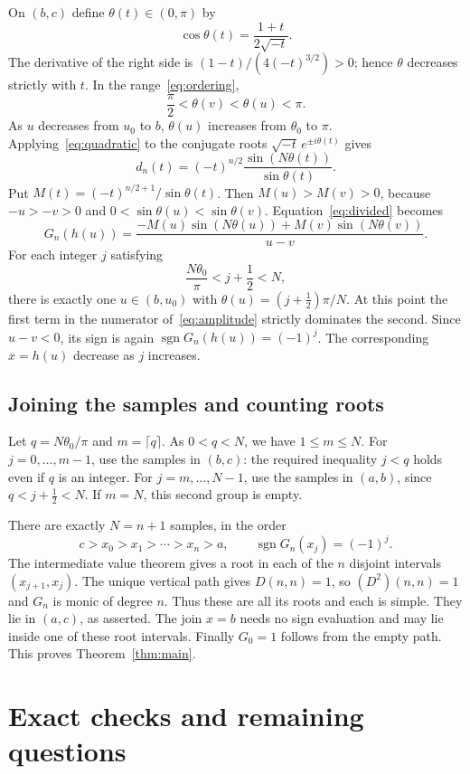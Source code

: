 \documentclass[11pt]{article}
\DeclareMathOperator{\sgn}{sgn}
\begin{document}
On $(b,c)$ define $\theta(t)\in(0,\pi)$ by
\[
 \cos\theta(t)=\frac{1+t}{2\sqrt{-t}}.
\]
The derivative of the right side is $(1-t)/(4(-t)^{3/2})>0$;
hence $\theta$ decreases strictly with $t$. In the range~\eqref{eq:ordering},
\[
 \frac\pi2<\theta(v)<\theta(u)<\pi.
\]
As $u$ decreases from $u_0$ to $b$, $\theta(u)$ increases from
$\theta_0$ to $\pi$. Applying~\eqref{eq:quadratic} to the conjugate
roots $\sqrt{-t}\,e^{\pm i\theta(t)}$ gives
\[
 d_n(t)=(-t)^{n/2}\frac{\sin(N\theta(t))}{\sin\theta(t)}.
\]
Put $M(t)=(-t)^{n/2+1}/\sin\theta(t)$. Then $M(u)>M(v)>0$,
because $-u>-v>0$ and
$0<\sin\theta(u)<\sin\theta(v)$. Equation~\eqref{eq:divided} becomes
\begin{equation}\label{eq:amplitude}
 G_n(h(u))=
 \frac{-M(u)\sin(N\theta(u))+M(v)\sin(N\theta(v))}{u-v}.
\end{equation}
For each integer $j$ satisfying
\begin{equation}\label{eq:leftindices}
 \frac{N\theta_0}{\pi}<j+\frac12<N,
\end{equation}
there is exactly one $u\in(b,u_0)$ with
$\theta(u)=(j+\tfrac12)\pi/N$. At this point the first term in the
numerator of~\eqref{eq:amplitude} strictly dominates the second.
Since $u-v<0$, its sign is again $\sgn G_n(h(u))=(-1)^j$.
The corresponding $x=h(u)$ decrease as $j$ increases.

\subsection{Joining the samples and counting roots}

Let $q=N\theta_0/\pi$ and $m=\lceil q\rceil$. As $0<q<N$,
we have $1\leq m\leq N$. For $j=0,\ldots,m-1$, use the samples
in $(b,c)$: the required inequality $j<q$ holds even if $q$ is an
integer. For $j=m,\ldots,N-1$, use the samples in $(a,b)$, since
$q<j+\tfrac12<N$. If $m=N$, this second group is empty.

There are exactly $N=n+1$ samples, in the order
\[
 c>x_0>x_1>\cdots>x_n>a,\qquad \sgn G_n(x_j)=(-1)^j.
\]
The intermediate value theorem gives a root in each of the $n$ disjoint
intervals $(x_{j+1},x_j)$. The unique vertical path gives $D(n,n)=1$,
so $(D^2)(n,n)=1$ and $G_n$ is monic of degree $n$. Thus these are
all its roots and each is simple. They lie in $(a,c)$, as asserted.
The join $x=b$ needs no sign evaluation and may lie inside one of these
root intervals. Finally $G_0=1$ follows from the empty path. This proves
Theorem~\ref{thm:main}.

\section{Exact checks and remaining questions}
\end{document}
